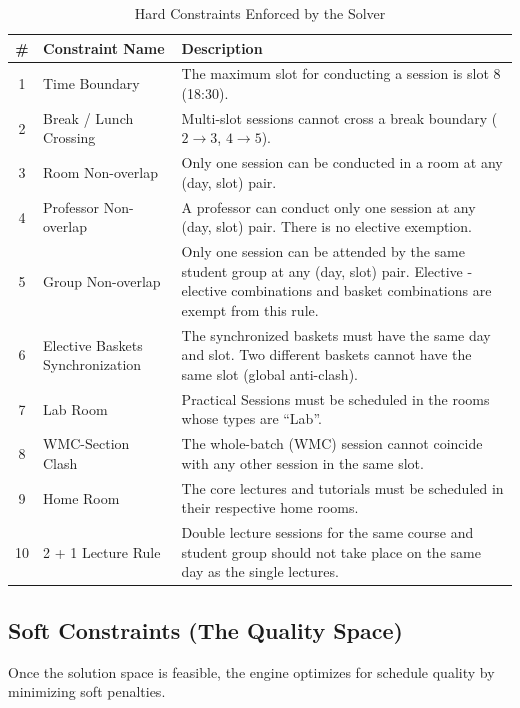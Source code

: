 \begin{table}[htbp]
\centering
\caption{Hard Constraints Enforced by the Solver}
\label{tab:hard_constraints}
\renewcommand{\arraystretch}{1.4}
\begin{tabularx}{\textwidth}{@{} c l X @{}}
\toprule
\textbf{\#} & \textbf{Constraint Name} & \textbf{Description} \\
\midrule
1 & Time Boundary & The maximum slot for conducting a session is slot 8 (18:30). \\
2 & Break / Lunch Crossing & Multi-slot sessions cannot cross a break boundary ($2 \rightarrow 3$, $4 \rightarrow 5$). \\
3 & Room Non-overlap & Only one session can be conducted in a room at any (day, slot) pair. \\
4 & Professor Non-overlap & A professor can conduct only one session at any (day, slot) pair. There is no elective exemption. \\
5 & Group Non-overlap & Only one session can be attended by the same student group at any (day, slot) pair. Elective - elective combinations and basket combinations are exempt from this rule. \\
6 & Elective Baskets Synchronization & The synchronized baskets must have the same day and slot. Two different baskets cannot have the same slot (global anti-clash). \\
7 & Lab Room & Practical Sessions must be scheduled in the rooms whose types are ``Lab''. \\
8 & WMC-Section Clash & The whole-batch (WMC) session cannot coincide with any other session in the same slot. \\
9 & Home Room & The core lectures and tutorials must be scheduled in their respective home rooms. \\
10 & 2 + 1 Lecture Rule & Double lecture sessions for the same course and student group should not take place on the same day as the single lectures. \\
\bottomrule
\end{tabularx}
\end{table}

\subsection{Soft Constraints (The Quality Space)}

Once the solution space is feasible, the engine optimizes for schedule quality by minimizing soft penalties.

